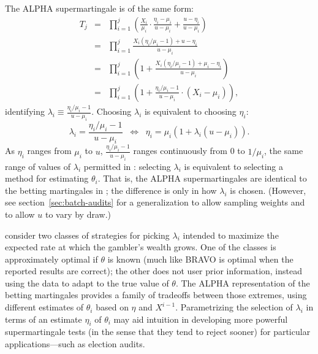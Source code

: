\documentclass[aoas]{imsart}
\begin{document}
The ALPHA supermartingale is of the same form:
\begin{eqnarray} \label{eq:lambda-form}
T_j &=& \prod_{i=1}^j \left ( \frac{X_i}{\mu_i} \cdot \frac{\eta_i-\mu_i}{u-\mu_i} + \frac{u-\eta_i}{u-\mu_i} \right ) \nonumber \\
&=& \prod_{i=1}^j \frac{X_i (\eta_i/\mu_i -1) + u - \eta_i}{u-\mu_i} \nonumber \\
&=& \prod_{i=1}^j \left ( 1 + \frac{X_i (\eta_i/\mu_i -1) + \mu_i - \eta_i}{u-\mu_i} \right ) \nonumber \\
&=&  \prod_{i=1}^j \left ( 1 + \frac{\eta_i/\mu_i -1}{u-\mu_i} \cdot (X_i - \mu_i) \right ),
\end{eqnarray}
identifying $\lambda_i \equiv \frac{\eta_i/\mu_i -1}{u-\mu_i}$.
Choosing $\lambda_i$ is equivalent to choosing $\eta_i$:
\begin{equation}
\lambda_i = \frac{\eta_i/\mu_i -1}{u-\mu_i} \;\; \Longleftrightarrow \;\; \eta_i = \mu_i \left ( 1 + \lambda_i (u-\mu_i) \right ).
\end{equation}
As $\eta_i$ ranges from $\mu_i$ to $u$, $\frac{\eta_i/\mu_i -1}{u-\mu_i}$ ranges continuously from
0 to $1/\mu_i$, the same range of values of $\lambda_i$ permitted in \citet{waudby-smithRamdas21,waudby-smithEtal21}:
selecting $\lambda_i$ is equivalent to selecting a method for estimating $\theta_i$.
That is, the ALPHA supermartingales are identical to the betting martingales in \citet{waudby-smithRamdas21,waudby-smithEtal21};
the difference is only in how $\lambda_i$ is chosen.
(However, see section~\ref{sec:batch-audits} for a generalization to allow sampling weights and to allow $u$ to
vary by draw.)

\citet{waudby-smithRamdas21,waudby-smithEtal21} consider two classes of strategies for picking $\lambda_i$ 
intended to maximize the expected rate at which the gambler's wealth grows. 
One of the classes is approximately optimal if $\theta$ is known (much like BRAVO is optimal when
the reported results are correct); the other does not user prior information,
instead using the data to adapt to the true value of $\theta$.
The ALPHA representation of the betting martingales provides a family of tradeoffs between those 
extremes, using different estimates
of $\theta_i$ based on $\eta$ and $X^{i-1}$.
Parametrizing the selection of $\lambda_i$ in terms of an estimate $\eta_i$ of $\theta_i$ 
may aid intuition in developing
more powerful supermartingale tests (in the sense that they tend to reject sooner) 
for particular applications---such as election audits.
\end{document}
